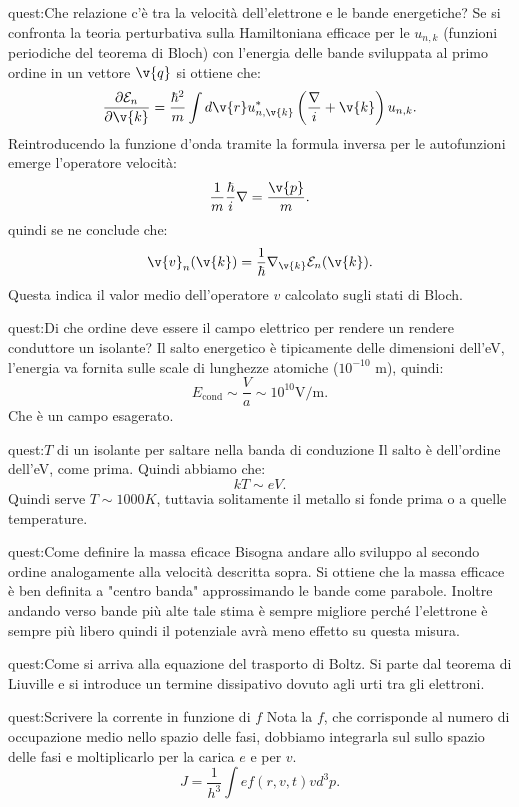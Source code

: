 \begin{quest}{quest:Che relazione c'è tra la velocità dell'elettrone e le bande energetiche?}
    Se si confronta la teoria perturbativa sulla Hamiltoniana efficace per le $u_{n,k}$ (funzioni periodiche del teorema di Bloch) con l'energia delle bande sviluppata al primo ordine in un vettore $\v{q}$ si ottiene che:
    \[
        \frac{\partial \mathcal{E}_n}{\partial \v{k}} 
	= 
	\frac{\hbar ^2}{m}
	\int d\v{r}
	u^*_{n,\v{k}}\left(\frac{\nabla }{i}+\v{k}\right)u_{n,k}
    .\] 
    Reintroducendo la funzione d'onda tramite la formula inversa per le autofunzioni emerge l'operatore velocità:
    \[
        \frac{1}{m}\frac{\hbar }{i}\nabla = \frac{\v{p}}{m}
    .\] 
    quindi se ne conclude che:
    \[
	\v{v}_n(\v{k}) 
	= 
    \frac{1}{\hbar }\nabla_{\v{k}}\mathcal{E}_n(\v{k}) 
    .\] 
    Questa indica il valor medio dell'operatore $v$ calcolato sugli stati di Bloch.
\end{quest}
\begin{quest}{quest:Di che ordine deve essere il campo elettrico per rendere un rendere conduttore un isolante?}
    Il salto energetico è tipicamente delle dimensioni dell'eV, l'energia va fornita sulle scale di lunghezze atomiche ($10^{-10}$ m), quindi:
    \[
        E_\text{cond}\sim \frac{V}{a} \sim 10^{10} \text{V/m}
    .\] 
    Che è un campo esagerato.
\end{quest}
\begin{quest}{quest:$T$ di un isolante per saltare nella banda di conduzione}
Il salto è dell'ordine dell'eV, come prima. Quindi abbiamo che:
\[
    kT \sim eV
.\] 
Quindi serve $T\sim 1000 K$, tuttavia solitamente il metallo si fonde prima o a quelle temperature.
\end{quest}
\begin{quest}{quest:Come definire la massa eficace}
Bisogna andare allo sviluppo al secondo ordine analogamente alla velocità descritta sopra. Si ottiene che la massa efficace è ben definita a "centro banda" approssimando le bande come parabole. Inoltre andando verso bande più alte tale stima è sempre migliore perché l'elettrone è sempre più libero quindi il potenziale avrà meno effetto su questa misura.
\end{quest}
\begin{quest}{quest:Come si arriva alla equazione del trasporto di Boltz.}
    Si parte dal teorema di Liuville e si introduce un termine dissipativo dovuto agli urti tra gli elettroni.
\end{quest}
\begin{quest}{quest:Scrivere la corrente in funzione di $f$}
Nota la $f$, che corrisponde al numero di occupazione medio nello spazio delle fasi, dobbiamo integrarla sul sullo spazio delle fasi e moltiplicarlo per la carica $e$ e per $v$.
\[
    J = \frac{1}{h^3}\int e f(r,v,t)v d^3p 
.\] 
\end{quest}
